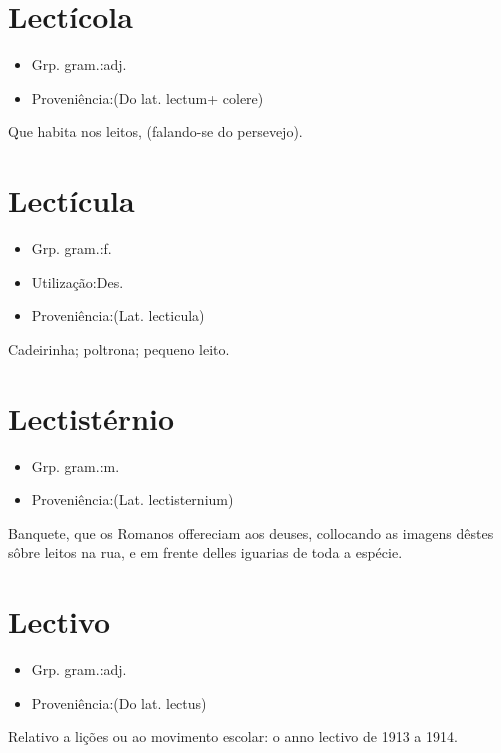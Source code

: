 \section{Lectícola}
\begin{itemize}
\item {Grp. gram.:adj.}
\end{itemize}
\begin{itemize}
\item {Proveniência:(Do lat. \textunderscore lectum\textunderscore  + \textunderscore colere\textunderscore )}
\end{itemize}
Que habita nos leitos, (falando-se do persevejo).
\section{Lectícula}
\begin{itemize}
\item {Grp. gram.:f.}
\end{itemize}
\begin{itemize}
\item {Utilização:Des.}
\end{itemize}
\begin{itemize}
\item {Proveniência:(Lat. \textunderscore lecticula\textunderscore )}
\end{itemize}
Cadeirinha; poltrona; pequeno leito.
\section{Lectistérnio}
\begin{itemize}
\item {Grp. gram.:m.}
\end{itemize}
\begin{itemize}
\item {Proveniência:(Lat. \textunderscore lectisternium\textunderscore )}
\end{itemize}
Banquete, que os Romanos offereciam aos deuses, collocando as imagens dêstes sôbre leitos na rua, e em frente delles iguarias de toda a espécie.
\section{Lectivo}
\begin{itemize}
\item {Grp. gram.:adj.}
\end{itemize}
\begin{itemize}
\item {Proveniência:(Do lat. \textunderscore lectus\textunderscore )}
\end{itemize}
Relativo a lições ou ao movimento escolar: \textunderscore o anno lectivo de 1913 a 1914\textunderscore .
